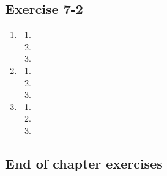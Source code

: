 \subsection{Exercise 7-2} %
\begin{enumerate}[itemsep=6pt, label=\textbf{\arabic*}. ] 
\item %
\begin{enumerate}[noitemsep, label=\textbf{(\alph*)} ]
\item %
\item %
\item %
\end{enumerate}

\item %
\begin{enumerate}[itemsep=5pt, label=\textbf{(\alph*)} ]
\item %
\item %
\item %
\end{enumerate}

\item %
\begin{enumerate}[noitemsep, label=\textbf{(\alph*)} ]
\item %
\item %
\item %
\end{enumerate}
\end{enumerate}

\subsection{End of chapter exercises} %

